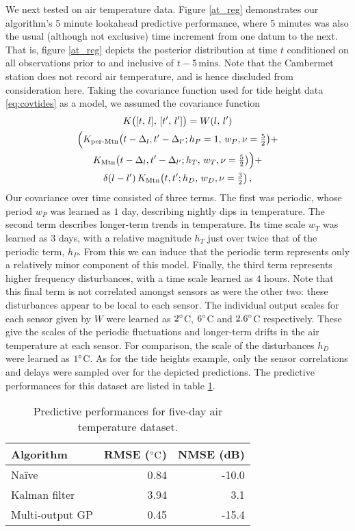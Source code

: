\documentclass{acmtrans2m}
\newcommand{\dnt}[1]{_{{#1}}}
\newcommand{\Kl}[1]{K_{\text{#1}}}
\begin{document}
We next tested on air temperature data. Figure \ref{at_reg} demonstrates our algorithm's 5 minute lookahead predictive performance, where 5 minutes was also the usual (although not exclusive) time increment from one datum to the next. That is, figure \ref{at_reg} depicts the posterior distribution at time $t$ conditioned on all observations prior to and inclusive of $t-5\,\text{mins}$. Note that the Cambermet station does not record air temperature, and is hence discluded from consideration here. Taking the covariance function used for tide height data \eqref{eq:covtides} as a model, we assumed the covariance function
\begin{multline*} %
 K\bigl([t,\,l],\,[t',\,l']\bigr)={W}(l,\,l')\\
\Bigl(
\Kl{per-Mtn}\bigl(t-\Delta_{l},t'-\Delta_{l'};h\dnt{P}=1,\,w_P,\nu=\tfrac{5}{2}\bigr)+
\\
\Kl{Mtn}\bigl(t-\Delta_{l},t'-\Delta_{l'};h\dnt{T},\,w\dnt{T},\nu=\tfrac{5}{2}\bigr)
\Bigr)+
\\
\dd{l}{l'}\Kl{Mtn}\bigl(t,t';h\dnt{D},\,w\dnt{D},\nu=\tfrac{3}{2}\bigr)
\,,
\end{multline*}
Our covariance over time consisted of three terms. The first was periodic, whose period $w_P$ was learned as $1$ day, describing nightly dips in temperature. The second term describes longer-term trends in temperature. Its time scale $w\dnt{T}$ was learned as $3$ days, with a relative magnitude $h\dnt{T}$ just over twice that of the periodic term, $h\dnt{P}$. From this we can induce that the periodic term represents only a relatively minor component of this model. Finally, the third term represents higher frequency disturbances, with a time scale learned as $4$ hours. Note that this final term is not correlated amongst sensors as were the other two: these disturbances appear to be local to each sensor. The individual output scales for each sensor given by $W$ were learned as $2^\circ$C, $6^\circ$C and $2.6^\circ$C respectively. These give the scales of the periodic fluctuations and longer-term drifts in the air temperature at each sensor. For comparison, the scale of the disturbances $h\dnt{D}$ were learned as $1^\circ$C. As for the tide heights example, only the sensor correlations and delays were sampled over for the depicted predictions. The predictive performances for this dataset are listed in table \ref{tbl:AT_RMSEs}.

\begin{table}
\centering
\caption{Predictive performances for five-day air temperature dataset.}
\label{tbl:AT_RMSEs}
 \begin{tabular}{@{}lrr@{}}
 \toprule
Algorithm & RMSE ($^\circ\text{C}$) & NMSE (dB)\\
\midrule
Na\"{i}ve & 0.84 & -10.0\\
Kalman filter & 3.94 & 3.1\\
Multi-output GP & 0.45 & -15.4\\
\bottomrule
\end{tabular}
\end{table}
\end{document}
